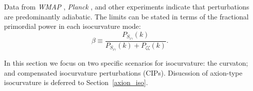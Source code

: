 Data from {\it WMAP\/} \cite{Dunkley:2008ie}, \textit{Planck} \cite{Ade:2013uln,Ade:2015lrj}, and other experiments \cite{Enqvist:2000hp,MacTavish:2005yk} indicate that perturbations are predominantly adiabatic. The limits can be stated in terms of the fractional primordial power in each isocurvature mode:\begin{equation}
\beta\equiv \frac{P_{S_{i\gamma}}(k)}{P_{S_{i\gamma}}(k)+P_{\zeta\zeta}(k)}.
\end{equation}

In this section we focus on two specific scenarios for isocurvature: the curvaton; and compensated isocurvature perturbations (CIPs). Disucssion of axion-type isocurvature is deferred to Section~\ref{axion_iso}.

